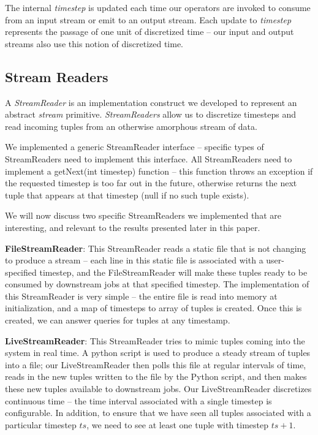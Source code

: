 \documentclass[a4paper, 10pt, conference]{IEEEconf}
\begin{document}
The internal \textit{timestep} is updated each time our operators are invoked to consume from an input stream or emit to an output stream. Each update to \textit{timestep} represents the passage of one unit of discretized time -- our input and output streams also use this notion of discretized time. 

\subsection{Stream Readers}
A \textit{StreamReader} is an implementation construct we developed to represent an abstract \textit{stream} primitive. \textit{StreamReaders} allow us to discretize timesteps and read incoming tuples from an otherwise amorphous stream of data.

We implemented a generic StreamReader interface -- specific types of StreamReaders need to implement this interface. All StreamReaders need to implement a getNext(int timestep) function -- this function throws an exception if the requested timestep is too far out in the future, otherwise returns the next tuple that appears at that timestep (null if no such tuple exists).

We will now discuss two specific StreamReaders we implemented that are interesting, and relevant to the results presented later in this paper.

\textbf{FileStreamReader}: This StreamReader reads a static file that is not changing to produce a stream -- each line in this static file is associated with a user-specified timestep, and the FileStreamReader will make these tuples ready to be consumed by downstream jobs at that specified timestep.
The implementation of this StreamReader is very simple -- the entire file is read into memory at initialization, and a map of timesteps to array of tuples is created. Once this is created, we can answer queries for tuples at any timestamp.

\textbf{LiveStreamReader}: This StreamReader tries to mimic tuples coming into the system in real time. A python script is used to produce a steady stream of tuples into a file; our LiveStreamReader then polls this file at regular intervals of time, reads in the new tuples written to the file by the Python script, and then makes these new tuples available to downstream jobs.
Our LiveStreamReader discretizes continuous time -- the time interval associated with a single timestep is configurable. In addition, to ensure that we have seen all tuples associated with a particular timestep $ts$, we need to see at least one tuple with timestep $ts + 1$.
\end{document}
